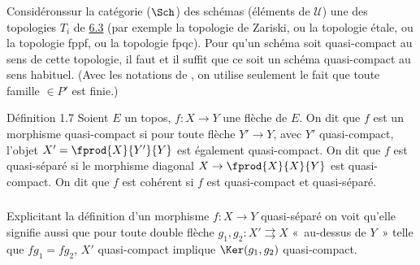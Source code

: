 \setcounter{subsection}{6}
\setcounter{subsubsection}{1}
\subsubsection{}
Considérons\pageoriginale sur la catégorie ($\Sch$) des schémas
(éléments de $𝒰$)
une des topologies $T_i$ de \cite{6} \hyperref[VI.def6.3]{6.3} (par exemple la topologie de
Zariski, ou la topologie étale, ou la topologie fppf, ou la topologie
fpqc). Pour qu'un schéma soit quasi-compact au sens de cette
topologie, il faut et il suffit que ce soit un schéma quasi-compact au
sens habituel. (Avec les notations de \loccit, on utilise seulement le
fait que toute famille $\in P'$ est finie.)

\begin{enonce*}{Définition 1.7}
Soient $E$ un topos, $f : X \to Y$ une flèche de $E$. On dit que $f$
est un morphisme quasi-compact si pour toute flèche $Y'\to Y$, avec
$Y'$ quasi-compact, l'objet $X'= \fprod{X}{Y'}{Y}$ est également
quasi-compact. On dit que $f$ est quasi-séparé si le morphisme
diagonal $X \to \fprod{X}{X}{Y}$ est quasi-compact. On dit que $f$ est
cohérent si $f$ est quasi-compact et quasi-séparé.
\end{enonce*}

\setcounter{subsection}{7}
\setcounter{subsubsection}{0}
\subsubsection{}
Explicitant la définition d'un morphisme $f : X \to Y$ quasi-séparé on
voit qu'elle signifie aussi que pour toute double flèche $g_1, g_2 :
X'\rightrightarrows X$ « au-dessus de $Y$ » \ie telle que $fg_1 =
fg_2$, $X'$ quasi-compact implique $\Ker(g_1, g_2)$ quasi-compact.

